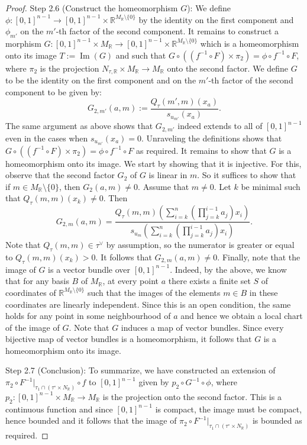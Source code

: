 \documentclass[11pt]{amsart}
\theoremstyle{definition}
\theoremstyle{remark}
\DeclareMathOperator{\im}{Im}
\begin{document}
\begin{proof}
	Step 2.6 (Construct the homeomorphism $G$): We define
	$\phi:[0,1]^{n-1}\to [0,1]^{n-1}\times\mathbb{R}^{M_{\mathbb{R}}\setminus \{0\}}$ by the identity on the first component and $\phi_{m'}$
	on the $m'$-th factor of the second component. It remains to construct a morphism $G:[0,1]^{n-1}\times M_{\mathbb{R}}\to [0,1]^{n-1}\times \mathbb{R}^{M_{\mathbb{R}}\setminus \{0\}}$
	which is a homeomorphism onto its image $T:=\im(G)$ and such that $G\circ ((f^{-1}\circ F)\times \pi_2)=\phi\circ f^{-1}\circ F$,
	where $\pi_2$ is the projection $N_{\tau,\mathbb{R}}\times M_{\mathbb{R}}\to M_{\mathbb{R}}$ onto the second factor.
	We define $G$ to be the identity on the first component and on the $m'$-th factor of the second component to be given by:
	$$G_{2,m'}(a,m):=\frac{Q_{\tau}(m',m)(x_a)}{s_{u_{m'}}(x_a)}.$$
	The same argument as above shows that $G_{2,m'}$ indeed extends to all of $[0,1]^{n-1}$ even in the cases when $s_{u_{m'}}(x_a)=0$.
	Unraveling the definitions shows that $G\circ ((f^{-1}\circ F)\times \pi_2)=\phi\circ f^{-1}\circ F$ as required. It remains to show that $G$ is a homeomorphism
	onto its image. We start by showing that it is injective. For this, observe that the second factor $G_2$ of $G$ is linear in $m$.
	So it suffices to show that if $m\in M_{\mathbb{R}}\setminus \{0\}$, then $G_2(a,m)\neq 0$. Assume that $m\neq 0$. Let $k$ be minimal such that
	$Q_{\tau}(m,m)(x_k)\neq 0$. Then
	$$G_{2,m}(a,m)=\frac{Q_{\tau}(m,m)\left(\sum_{i=k}^{n}\left(\prod_{j=k}^{i-1}a_j\right)x_i\right)}{s_{u_m}\left(\sum_{i=k}^{n}\left(\prod_{j=k}^{i-1}a_j\right)x_i\right)}.$$
	Note that $Q_{\tau}(m,m)\in \tau^{\vee}$ by assumption, so the numerator is greater or equal to $Q_{\tau}(m,m)(x_k)>0$. It
	follows that $G_{2,m}(a,m)\neq 0$. Finally, note that the image of $G$ is a vector bundle over $[0,1]^{n-1}$. Indeed, by the above, we know that for any basis $B$ of $M_{\mathbb{R}}$, at every point $a$ there
	exists a finite set $S$ of coordinates of $\mathbb{R}^{M_{\mathbb{R}}\setminus \{0\}}$ such that the images of the elements $m\in B$ in these coordinates are linearly independent. Since this is an open condition, the same holds for any point in some neighbourhood of $a$
	and hence we obtain a local chart of the image of $G$. Note that
	$G$ induces a map of vector bundles. Since every bijective map of vector bundles is a homeomorphism, it follows that $G$ is a homeomorphism onto
	its image.

	Step 2.7 (Conclusion): To summarize, we have constructed an extension of $\pi_2\circ F^{-1}|_{\tau_1\cap (\tau^{\circ}\times N_{\mathbb{R}})}\circ f$ to $[0,1]^{n-1}$
	given by $p_2\circ G^{-1}\circ \phi$, where $p_2:[0,1]^{n-1} \times M_{\mathbb{R}}\to M_{\mathbb{R}}$ is the projection
	onto the second factor. This is a continuous function and since $[0,1]^{n-1}$ is compact, the image
	must be compact, hence bounded and it follows that the image of
	$\pi_2\circ F^{-1}|_{\tau_1\cap (\tau^{\circ}\times N_{\mathbb{R}})}$ is bounded as required.
\end{proof}
\end{document}
